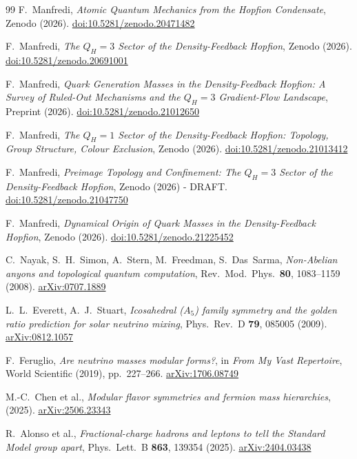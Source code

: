 \documentclass[11pt,a4paper]{article}
\theoremstyle{definition}\newtheorem{definition}[theorem]{Definition}
\theoremstyle{remark}
\begin{document}
\begin{thebibliography}{99}
F.~Manfredi,
\textit{Atomic Quantum Mechanics from the Hopfion Condensate},
Zenodo (2026).
\href{https://doi.org/10.5281/zenodo.20471482}{doi:10.5281/zenodo.20471482}

F.~Manfredi,
\textit{The $Q_H=3$ Sector of the Density-Feedback Hopfion},
Zenodo (2026).
\href{https://doi.org/10.5281/zenodo.20691001}{doi:10.5281/zenodo.20691001}

F.~Manfredi,
\textit{Quark Generation Masses in the Density-Feedback Hopfion:
A Survey of Ruled-Out Mechanisms and the $Q_H=3$ Gradient-Flow Landscape},
Preprint (2026).
\href{https://doi.org/10.5281/zenodo.21012650}{doi:10.5281/zenodo.21012650}

 F.~Manfredi,
\textit{The $Q_H=1$ Sector of the
Density-Feedback Hopfion: Topology, Group Structure, Colour Exclusion},
Zenodo (2026).
\href{https://doi.org/10.5281/zenodo.21013412}{doi:10.5281/zenodo.21013412}

F.~Manfredi,
\textit{Preimage Topology and Confinement: The $Q_H=3$ Sector of the Density-Feedback Hopfion},
Zenodo (2026) - DRAFT.
\href{https://doi.org/10.5281/zenodo.21047750}{doi:10.5281/zenodo.21047750}

F.~Manfredi,
\textit{Dynamical Origin of Quark Masses in the Density-Feedback Hopfion},
Zenodo (2026).
\href{https://doi.org/10.5281/zenodo.21225452}{doi:10.5281/zenodo.21225452}

C.~Nayak, S.~H.~Simon, A.~Stern, M.~Freedman, S.~Das~Sarma,
\textit{Non-Abelian anyons and topological quantum computation},
Rev.\ Mod.\ Phys.\ \textbf{80}, 1083--1159 (2008).
\href{https://arxiv.org/abs/0707.1889}{arXiv:0707.1889}

L.~L.~Everett, A.~J.~Stuart,
\textit{Icosahedral ($A_5$) family symmetry and the golden ratio
prediction for solar neutrino mixing},
Phys.\ Rev.\ D \textbf{79}, 085005 (2009).
\href{https://arxiv.org/abs/0812.1057}{arXiv:0812.1057}

F.~Feruglio,
\textit{Are neutrino masses modular forms?},
in \textit{From My Vast Repertoire}, World Scientific (2019), pp.\ 227--266.
\href{https://arxiv.org/abs/1706.08749}{arXiv:1706.08749}

M.-C.~Chen et al.,
\textit{Modular flavor symmetries and fermion mass hierarchies},
(2025).
\href{https://arxiv.org/abs/2506.23343}{arXiv:2506.23343}

R.~Alonso et al.,
\textit{Fractional-charge hadrons and leptons to tell the Standard Model
group apart},
Phys.\ Lett.\ B \textbf{863}, 139354 (2025).
\href{https://arxiv.org/abs/2404.03438}{arXiv:2404.03438}

\end{thebibliography}
\end{document}
